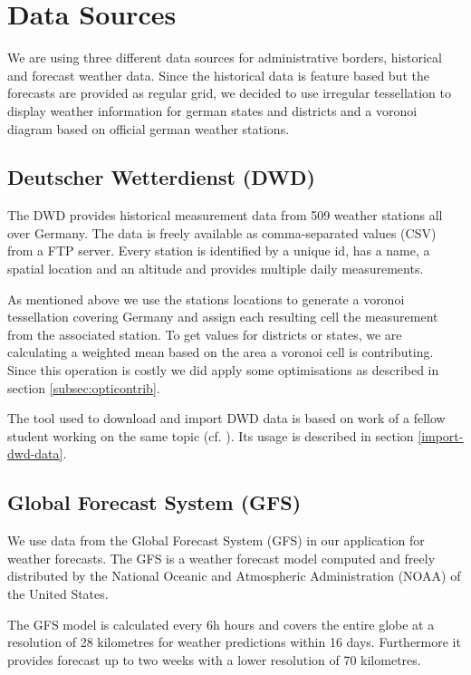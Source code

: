 \documentclass[paper=a4, fontsize=11pt]{article} %
\numberwithin{equation}{section} %
\numberwithin{figure}{section} %
\numberwithin{table}{section} %
\begin{document}
\newpage
\section{Data Sources}\label{sec:datasources}

We are using three different data sources for administrative borders, historical
and forecast weather data. Since the historical data is feature based but the
forecasts are provided as regular grid, we decided to use irregular tessellation to display
weather information for german states and districts and a voronoi diagram based
on official german weather stations.

\subsection{Deutscher Wetterdienst (DWD)}
The DWD provides historical measurement data from 509 weather stations all over
Germany. The data is freely available as comma-separated values (CSV) from a FTP
server. Every station is identified by a unique id, has a name, a spatial location
and an altitude and provides multiple daily measurements.

As mentioned above we use the stations locations to generate a voronoi tessellation
covering Germany and assign each resulting cell the measurement from the associated
station. To get values for districts or states, we are calculating a weighted mean
based on the area a voronoi cell is contributing. Since this operation is costly
we did apply some optimisations as described in section \ref{subsec:opticontrib}.

The tool used to download and import DWD data is based on work of a fellow student
working on the same topic (cf. \cite{website:cholin}). Its usage is described in section \ref{import-dwd-data}.


\subsection{Global Forecast System (GFS)}
We use data from the Global Forecast System (GFS) in our application for weather
forecasts. The GFS is a weather forecast model computed and freely distributed
by the National Oceanic and Atmospheric Administration (NOAA) of the United States.


The GFS model is calculated every 6h hours and covers the entire globe at a resolution
of 28 kilometres for weather predictions within 16 days. Furthermore it provides
forecast up to two weeks with a lower resolution of 70 kilometres.
\end{document}

